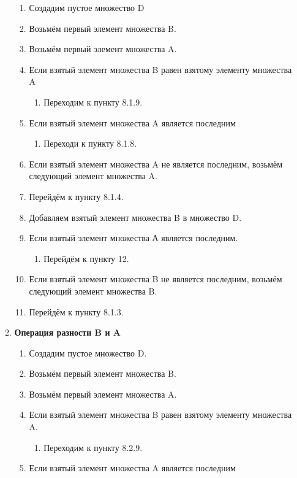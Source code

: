 \documentclass[a4paper,12pt]{extarticle}
\begin{document}
\begin{enumerate}
\begin{enumerate}[label*=\arabic*.]
\begin{enumerate}[label*=\arabic*.]
    \item Создадим пустое множество D
    \item Возьмём первый элемент множества B.
    \item Возьмём первый элемент множества A.
    \item Если взятый элемент множества B равен взятому элементу множества A
    \begin{enumerate}[label*=\arabic*.]
      \item Переходим к пункту 8.1.9.
    \end{enumerate}
    \item Если взятый элемент множества A является последним
    \begin{enumerate}[label*=\arabic*.]
      \item Переходи к пункту 8.1.8.
    \end{enumerate}
    \item Если взятый элемент множества A не является последним, возьмём следующий элемент множества A.
    \item Перейдём к пункту 8.1.4.
    \item Добавляем взятый элемент множества B в множество D.
    \item Если взятый элемент множества А является последним.
    \begin{enumerate}[label*=\arabic*.]
      \item Перейдём к пункту 12.
    \end{enumerate}
    \item Если взятый элемент множества B не является последним, возьмём следующий элемент множества B.
    \item Перейдём к пункту 8.1.3.
  \end{enumerate}
  \item\textbf{Операция разности B и A}
  \begin{enumerate}[label*=\arabic*.]
    \item Создадим пустое множество D.
    \item Возьмём первый элемент множества B.
    \item Возьмём первый элемент множества A.
    \item Если взятый элемент множества B равен взятому элементу множества A.
    \begin{enumerate}[label*=\arabic*.]
      \item Переходим к пункту 8.2.9.
    \end{enumerate}
    \item Если взятый элемент множества A является последним

\end{enumerate}
\end{enumerate}
\end{enumerate}
\end{document}
